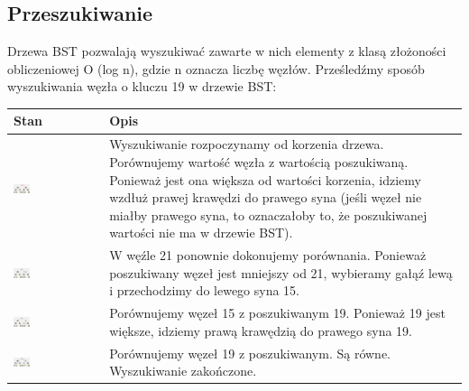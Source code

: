 \documentclass{article}
\begin{document}
\subsection*{Przeszukiwanie}
Drzewa BST pozwalają wyszukiwać zawarte w nich elementy z klasą złożoności obliczeniowej O (log n), gdzie n oznacza liczbę węzłów. Prześledźmy sposób wyszukiwania węzła o kluczu 19 w drzewie BST:

\begin{tabular}{|>{\centering\arraybackslash}m{}|>{\centering\arraybackslash}m{}|}
\hline
\textbf{Stan} & \textbf{Opis} \\
\hline
\href{https://i.imgur.com/JAxl8x6.png}{\includegraphics[width=0.2\textwidth]{"../assets/1_1.png"}} & Wyszukiwanie rozpoczynamy od korzenia drzewa. Porównujemy wartość węzła z wartością poszukiwaną. Ponieważ jest ona większa od wartości korzenia, idziemy wzdłuż prawej krawędzi do prawego syna (jeśli węzeł nie miałby prawego syna, to oznaczałoby to, że poszukiwanej wartości nie ma w drzewie BST). \\
\hline
\href{https://i.imgur.com/rmndQqe.png}{\includegraphics[width=0.2\textwidth]{"../assets/1_2.png"}} & W węźle 21 ponownie dokonujemy porównania. Ponieważ poszukiwany węzeł jest mniejszy od 21, wybieramy gałąź lewą i przechodzimy do lewego syna 15. \\
\hline
\href{https://i.imgur.com/XnmcQai.png}{\includegraphics[width=0.2\textwidth]{"../assets/1_3.png"}} & Porównujemy węzeł 15 z poszukiwanym 19. Ponieważ 19 jest większe, idziemy prawą krawędzią do prawego syna 19. \\
\hline
\href{https://i.imgur.com/ngdZBi0.png}{\includegraphics[width=0.2\textwidth]{"../assets/1_4.png"}} & Porównujemy węzeł 19 z poszukiwanym. Są równe. Wyszukiwanie zakończone. \\
\hline
\end{tabular}
\end{document}
